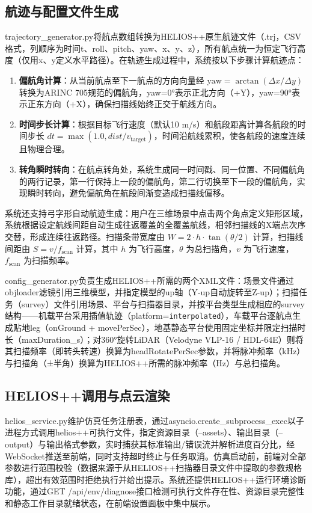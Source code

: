 \documentclass[a4paper,fleqn]{cas-sc}
\begin{document}
\subsection{航迹与配置文件生成}
trajectory\_generator.py将航点数组转换为HELIOS++原生航迹文件（.trj，CSV格式，列顺序为时间t、roll、pitch、yaw、x、y、z），所有航点统一为恒定飞行高度（仅用x、y定义水平路径）。在轨迹生成过程中，系统按以下步骤计算航迹点：

\begin{enumerate}
    \item \textbf{偏航角计算}：从当前航点至下一航点的方向向量经 $\text{yaw} = \arctan(\Delta x / \Delta y)$ 转换为ARINC 705规范的偏航角，yaw=0°表示正北方向（+Y），yaw=90°表示正东方向（+X），确保扫描线始终正交于航线方向。
    \item \textbf{时间步长计算}：根据目标飞行速度（默认10 m/s）和航段距离计算各航段的时间步长 $dt = \max(1.0, dist / v_{\text{target}})$，时间沿航线累积，使各航段的速度连续且物理合理。
    \item \textbf{转角瞬时转向}：在航点转角处，系统生成同一时间戳、同一位置、不同偏航角的两行记录，第一行保持上一段的偏航角，第二行切换至下一段的偏航角，实现瞬时转向，避免偏航角在航段间渐变造成扫描线偏移。
\end{enumerate}

系统还支持弓字形自动航迹生成：用户在三维场景中点击两个角点定义矩形区域，系统根据设定航线间距自动生成往返覆盖的全覆盖航线，相邻扫描线的X端点次序交替，形成连续往返路径。扫描条带宽度由 $W = 2 \cdot h \cdot \tan(\theta / 2)$ 计算，扫描线间距由 $S = v / f_{\text{scan}}$ 计算，其中 $h$ 为飞行高度，$\theta$ 为总扫描角，$v$ 为飞行速度，$f_{\text{scan}}$ 为扫描频率。

config\_generator.py负责生成HELIOS++所需的两个XML文件：场景文件通过objloader滤镜引用三维模型，并指定模型的up轴（Y-up自动旋转至Z-up）；扫描任务（survey）文件引用场景、平台与扫描器目录，并按平台类型生成相应的survey结构——机载平台采用插值轨迹（platform=\texttt{interpolated}），车载平台逐航点生成贴地leg（onGround + movePerSec），地基静态平台使用固定坐标并限定扫描时长（maxDuration\_s）；对360°旋转LiDAR（Velodyne VLP-16 / HDL-64E）则将其扫描频率（即转头转速）换算为headRotatePerSec参数，并将脉冲频率（kHz）与扫描角（±半角）换算为HELIOS++所需的脉冲频率（Hz）与总扫描角。

\subsection{HELIOS++调用与点云渲染}
helios\_service.py维护仿真任务注册表，通过asyncio.create\_subprocess\_exec以子进程方式调用helios++可执行文件，指定资源目录（--assets）、输出目录（--output）与输出格式参数，实时捕获其标准输出/错误流并解析进度百分比，经WebSocket推送至前端，同时支持超时终止与任务取消。仿真启动前，前端对全部参数进行范围校验（数据来源于从HELIOS++扫描器目录文件中提取的参数规格库），超出有效范围时拒绝执行并给出提示。系统还提供HELIOS++运行环境诊断功能，通过GET /api/env/diagnose接口检测可执行文件存在性、资源目录完整性和静态工作目录就绪状态，在前端设置面板中集中展示。
\end{document}
